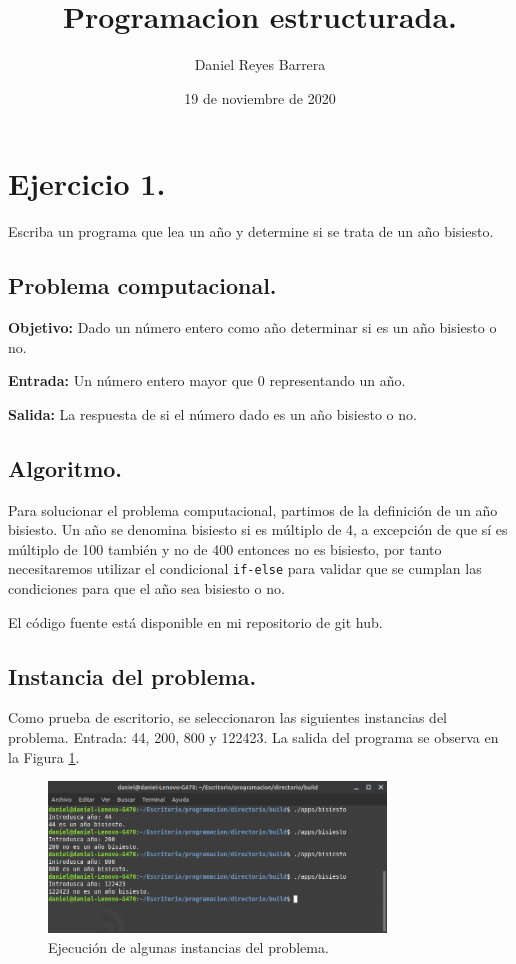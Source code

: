 \documentclass[12pt,letterpaper]{article}
\title{{Programacion estructurada.}}
\author{Daniel Reyes Barrera}
\date{19 de noviembre de 2020}
\begin{document}
\maketitle
{}


\section{Ejercicio 1.}

Escriba un programa que lea un año y determine si se trata de un año bisiesto.

\subsection{Problema computacional.}
\textbf{Objetivo:} Dado un n\'umero entero como año determinar si es un año bisiesto o no.

\textbf{Entrada:} Un n\'umero entero mayor que 0 representando un año.

\textbf{Salida:} La respuesta de si el n\'umero dado es un año bisiesto o no.

\subsection{Algoritmo.}
Para solucionar el problema computacional, partimos de la definici\'on de un año bisiesto. Un año se denomina bisiesto si es m\'ultiplo de 4, a excepci\'on de que s\'i es m\'ultiplo de 100 tambi\'en y no de 400 entonces no es bisiesto, por tanto necesitaremos utilizar el condicional \texttt{if-else} para validar que se cumplan las condiciones para que el año sea bisiesto o no.


El código fuente está disponible en mi repositorio de git hub. \cite{url:bisiesto}

\subsection{Instancia del problema.}
Como prueba de escritorio, se seleccionaron las siguientes instancias del problema. Entrada: 44, 200, 800 y 122423. La salida del programa se observa en la Figura \ref{fig:bisiesto}.
\begin{figure}[ht!]
  \centering
  \includegraphics[width=0.8\textwidth]{figures/bisiesto}
  \caption{Ejecución de algunas instancias del problema.}
  \label{fig:bisiesto}
\end{figure}
\end{document}
